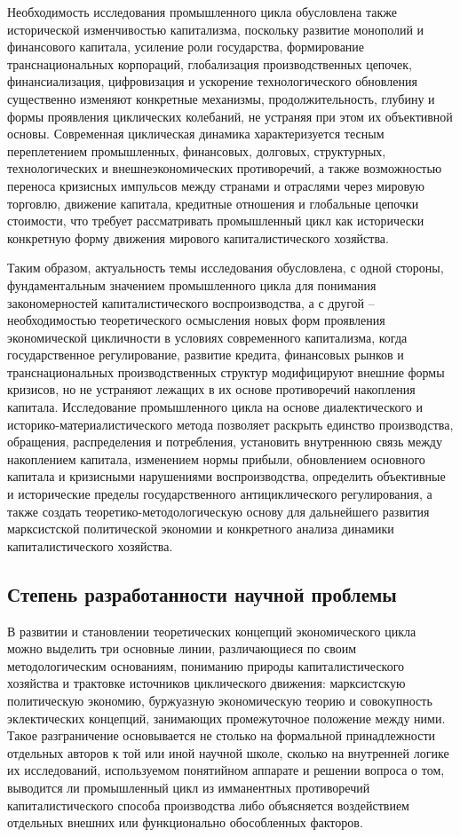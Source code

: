 Необходимость исследования промышленного цикла обусловлена также исторической изменчивостью капитализма, поскольку развитие монополий и финансового капитала, усиление роли государства, формирование транснациональных корпораций, глобализация производственных цепочек, финансиализация, цифровизация и ускорение технологического обновления существенно изменяют конкретные механизмы, продолжительность, глубину и формы проявления циклических колебаний, не устраняя при этом их объективной основы. Современная циклическая динамика характеризуется тесным переплетением промышленных, финансовых, долговых, структурных, технологических и внешнеэкономических противоречий, а также возможностью переноса кризисных импульсов между странами и отраслями через мировую торговлю, движение капитала, кредитные отношения и глобальные цепочки стоимости, что требует рассматривать промышленный цикл как исторически конкретную форму движения мирового капиталистического хозяйства.

Таким образом, актуальность темы исследования обусловлена, с одной стороны, фундаментальным значением промышленного цикла для понимания закономерностей капиталистического воспроизводства, а с другой – необходимостью теоретического осмысления новых форм проявления экономической цикличности в условиях современного капитализма, когда государственное регулирование, развитие кредита, финансовых рынков и транснациональных производственных структур модифицируют внешние формы кризисов, но не устраняют лежащих в их основе противоречий накопления капитала. Исследование промышленного цикла на основе диалектического и историко-материалистического метода позволяет раскрыть единство производства, обращения, распределения и потребления, установить внутреннюю связь между накоплением капитала, изменением нормы прибыли, обновлением основного капитала и кризисными нарушениями воспроизводства, определить объективные и исторические пределы государственного антициклического регулирования, а также создать теоретико-методологическую основу для дальнейшего развития марксистской политической экономии и конкретного анализа динамики капиталистического хозяйства.

\subsection*{Степень разработанности научной проблемы}
В развитии и становлении теоретических концепций экономического цикла можно выделить три основные линии, различающиеся по своим методологическим основаниям, пониманию природы капиталистического хозяйства и трактовке источников циклического движения: марксистскую политическую экономию, буржуазную экономическую теорию и совокупность эклектических концепций, занимающих промежуточное положение между ними. Такое разграничение основывается не столько на формальной принадлежности отдельных авторов к той или иной научной школе, сколько на внутренней логике их исследований, используемом понятийном аппарате и решении вопроса о том, выводится ли промышленный цикл из имманентных противоречий капиталистического способа производства либо объясняется воздействием отдельных внешних или функционально обособленных факторов.

